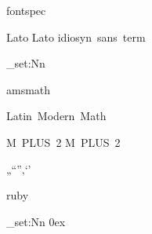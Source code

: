 \RequirePackage
	{ fontspec }


\setmainfont
	{ Lato }
\setsansfont
	{ Lato }
\setmonofont
	{ idiosyn~sans~term }

\tl_set:Nn
	\familydefault
	\sfdefault

\RequirePackage
	{ amsmath }
\RequirePackage
	[ math-style = upright ]
	{ unicode-math }

\setmathfont
	{ Latin~Modern~Math }


\setCJKmainfont
	{ M~PLUS~2 }
\setCJKsansfont
	{ M~PLUS~2 }

\normalspacedchars
	{ „“”‚‘’ }

\RequirePackage
	{ ruby }

\tl_set:Nn
	\rubysep
	{ 0ex }

